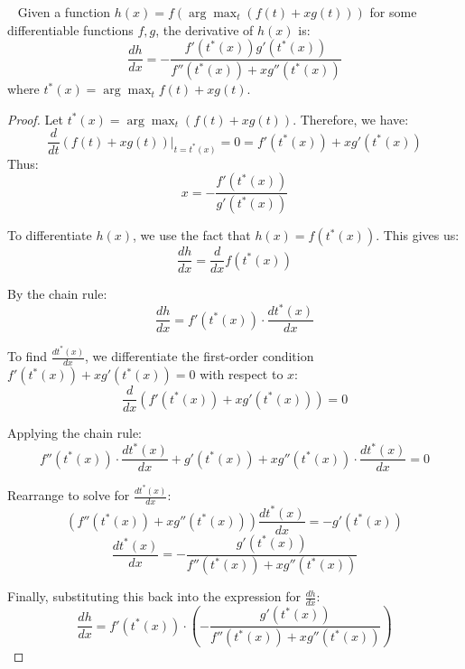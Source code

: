\begin{lemma}~\label{lemma:argmax-derivative}
Given a function $h(x) = f(\arg\max_t (f(t) + x g(t)))$ for some differentiable functions $f, g$, the derivative of $h(x)$ is:
    \[
        \frac{dh}{dx} = -\frac{f'(t^*(x)) g'(t^*(x))}{f''(t^*(x)) + x g''(t^*(x))}
    \]
    where $t^*(x) = \arg\max_t f(t) + x g(t)$.
\end{lemma}
\begin{proof}
Let $t^*(x) = \arg\max_t (f(t) + x g(t))$. Therefore, we have:
\[
    \frac{d}{dt} \left( f(t) + x g(t) \right) \bigg|_{t = t^*(x)} = 0 = f'(t^*(x)) + x g'(t^*(x))
\]
Thus:
\[ x = -\frac{f'(t^*(x))}{g'(t^*(x))} \]

To differentiate \( h(x) \), we use the fact that \( h(x) = f(t^*(x)) \). This gives us:
\[ \frac{dh}{dx} = \frac{d}{dx} f(t^*(x)) \]

By the chain rule:
\[ \frac{dh}{dx} = f'(t^*(x)) \cdot \frac{dt^*(x)}{dx} \]

To find \( \frac{dt^*(x)}{dx} \), we differentiate the first-order condition \( f'(t^*(x)) + x g'(t^*(x)) = 0 \) with respect to \( x \):
\[ \frac{d}{dx} \left( f'(t^*(x)) + x g'(t^*(x)) \right) = 0 \]

Applying the chain rule:
\[ f''(t^*(x)) \cdot \frac{dt^*(x)}{dx} + g'(t^*(x)) + x g''(t^*(x)) \cdot \frac{dt^*(x)}{dx} = 0 \]

Rearrange to solve for \( \frac{dt^*(x)}{dx} \):
\[ \left( f''(t^*(x)) + x g''(t^*(x)) \right) \frac{dt^*(x)}{dx} = -g'(t^*(x)) \]
\[ \frac{dt^*(x)}{dx} = -\frac{g'(t^*(x))}{f''(t^*(x)) + x g''(t^*(x))} \]

Finally, substituting this back into the expression for \( \frac{dh}{dx} \):
\[ \frac{dh}{dx} = f'(t^*(x)) \cdot \left( -\frac{g'(t^*(x))}{f''(t^*(x)) + x g''(t^*(x))} \right) \]

\end{proof}

